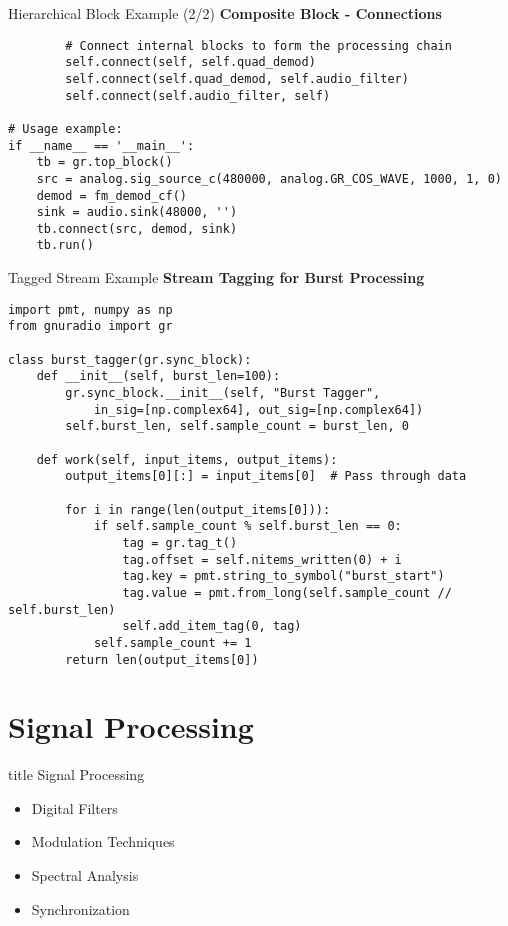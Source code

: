 \documentclass[aspectratio=169,11pt]{beamer}
\begin{document}
\begin{frame}[fragile]{Hierarchical Block Example (2/2)}
\textbf{Composite Block - Connections}
\tiny
\begin{verbatim}
        # Connect internal blocks to form the processing chain
        self.connect(self, self.quad_demod)
        self.connect(self.quad_demod, self.audio_filter) 
        self.connect(self.audio_filter, self)
        
# Usage example:
if __name__ == '__main__':
    tb = gr.top_block()
    src = analog.sig_source_c(480000, analog.GR_COS_WAVE, 1000, 1, 0)
    demod = fm_demod_cf()
    sink = audio.sink(48000, '')
    tb.connect(src, demod, sink)
    tb.run()
\end{verbatim}
\end{frame}

\begin{frame}[fragile]{Tagged Stream Example}
\textbf{Stream Tagging for Burst Processing}
\tiny
\begin{verbatim}
import pmt, numpy as np
from gnuradio import gr

class burst_tagger(gr.sync_block):
    def __init__(self, burst_len=100):
        gr.sync_block.__init__(self, "Burst Tagger",
            in_sig=[np.complex64], out_sig=[np.complex64])
        self.burst_len, self.sample_count = burst_len, 0
    
    def work(self, input_items, output_items):
        output_items[0][:] = input_items[0]  # Pass through data
        
        for i in range(len(output_items[0])):
            if self.sample_count % self.burst_len == 0:
                tag = gr.tag_t()
                tag.offset = self.nitems_written(0) + i
                tag.key = pmt.string_to_symbol("burst_start")
                tag.value = pmt.from_long(self.sample_count // self.burst_len)
                self.add_item_tag(0, tag)
            self.sample_count += 1
        return len(output_items[0])
\end{verbatim}
\end{frame}

\section{Signal Processing}

\begin{frame}[plain]
\vfill
\centering
\begin{beamercolorbox}[sep=8pt,center,shadow=true,rounded=true]{title}
\Large Signal Processing\par
\end{beamercolorbox}
\vfill
\begin{itemize}
    \item Digital Filters
    \item Modulation Techniques
    \item Spectral Analysis
    \item Synchronization
\end{itemize}
\vfill
\end{frame}
\end{document}
